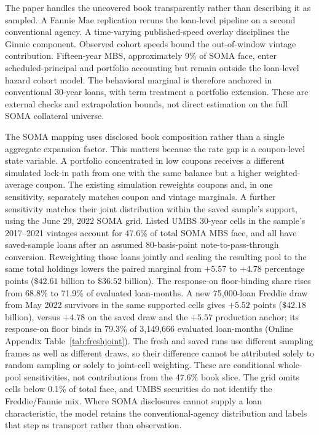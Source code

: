 The paper handles the uncovered book transparently rather than describing it as sampled. A Fannie Mae replication reruns the loan-level pipeline on a second conventional agency. A time-varying published-speed overlay disciplines the Ginnie component. Observed cohort speeds bound the out-of-window vintage contribution. Fifteen-year MBS, approximately 9\% of SOMA face, enter scheduled-principal and portfolio accounting but remain outside the loan-level hazard cohort model. The behavioral marginal is therefore anchored in conventional 30-year loans, with term treatment a portfolio extension. These are external checks and extrapolation bounds, not direct estimation on the full SOMA collateral universe.

The SOMA mapping uses disclosed book composition rather than a single aggregate expansion factor. This matters because the rate gap is a coupon-level state variable. A portfolio concentrated in low coupons receives a different simulated lock-in path from one with the same balance but a higher weighted-average coupon. The existing simulation reweights coupons and, in one sensitivity, separately matches coupon and vintage marginals. A further sensitivity matches their joint distribution within the saved sample's support, using the June 29, 2022 SOMA grid. Listed UMBS 30-year cells in the sample's 2017--2021 vintages account for 47.6\% of total SOMA MBS face, and all have saved-sample loans after an assumed 80-basis-point note-to-pass-through conversion. Reweighting those loans jointly and scaling the resulting pool to the same total holdings lowers the paired marginal from $+5.57$ to $+4.78$ percentage points ($\$42.61$ billion to $\$36.52$ billion). The response-on floor-binding share rises from 68.8\% to 71.9\% of evaluated loan-months. A new 75,000-loan Freddie draw from May 2022 survivors in the same supported cells gives $+5.52$ points ($\$42.18$ billion), versus $+4.78$ on the saved draw and the $+5.57$ production anchor; its response-on floor binds in 79.3\% of 3,149,666 evaluated loan-months (Online Appendix Table~\ref{tab:freshjoint}). The fresh and saved runs use different sampling frames as well as different draws, so their difference cannot be attributed solely to random sampling or solely to joint-cell weighting. These are conditional whole-pool sensitivities, not contributions from the 47.6\% book slice. The grid omits cells below 0.1\% of total face, and UMBS securities do not identify the Freddie/Fannie mix. Where SOMA disclosures cannot supply a loan characteristic, the model retains the conventional-agency distribution and labels that step as transport rather than observation.

